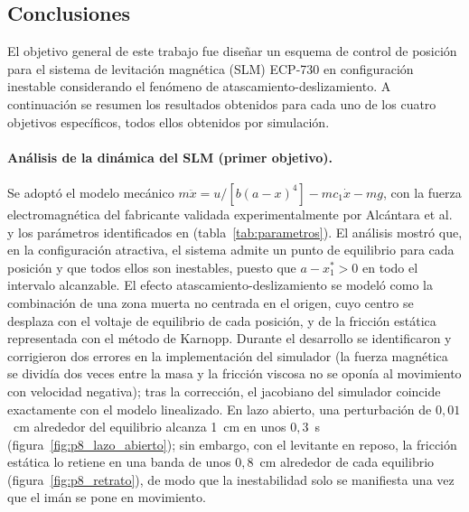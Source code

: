 \subsection{Conclusiones}

El objetivo general de este trabajo fue diseñar un esquema de control de posición para el sistema de levitación magnética (SLM) ECP-730 en configuración inestable considerando el fenómeno de atascamiento-deslizamiento. A continuación se resumen los resultados obtenidos para cada uno de los cuatro objetivos específicos, todos ellos obtenidos por simulación.

\paragraph{Análisis de la dinámica del SLM (primer objetivo).}
Se adoptó el modelo mecánico $m\ddot{x} = u/[b(a-x)^4] - m c_1\dot{x} - mg$, con la fuerza electromagnética del fabricante validada experimentalmente por Alcántara et al.\ \cite{alcantara} y los parámetros identificados en \cite{diana_tesis} (tabla~\ref{tab:parametros}). El análisis mostró que, en la configuración atractiva, el sistema admite un punto de equilibrio para cada posición y que todos ellos son inestables, puesto que $a - x_1^* > 0$ en todo el intervalo alcanzable. El efecto atascamiento-deslizamiento se modeló como la combinación de una zona muerta no centrada en el origen, cuyo centro se desplaza con el voltaje de equilibrio de cada posición, y de la fricción estática representada con el método de Karnopp. Durante el desarrollo se identificaron y corrigieron dos errores en la implementación del simulador (la fuerza magnética se dividía dos veces entre la masa y la fricción viscosa no se oponía al movimiento con velocidad negativa); tras la corrección, el jacobiano del simulador coincide exactamente con el modelo linealizado. En lazo abierto, una perturbación de $0{,}01$~cm alrededor del equilibrio alcanza 1~cm en unos $0{,}3$~s (figura~\ref{fig:p8_lazo_abierto}); sin embargo, con el levitante en reposo, la fricción estática lo retiene en una banda de unos $0{,}8$~cm alrededor de cada equilibrio (figura~\ref{fig:p8_retrato}), de modo que la inestabilidad solo se manifiesta una vez que el imán se pone en movimiento.


